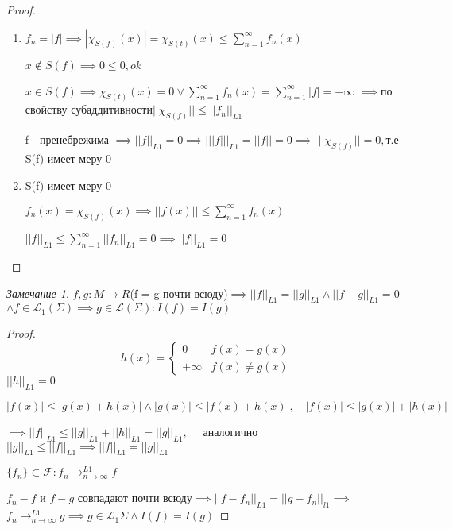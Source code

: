 \documentclass[a4paper]{article}
\theoremstyle{definition}
\theoremstyle{remark}
\newtheorem*{remark}{Замечание}
\begin{document}
\begin{proof}
     \begin{enumerate}
          \item $f_n = |f|\implies |\chi_{S(f)}(x)| = \chi_{S(t)} (x)\leq \sum_{n = 1}^{\infty} f_n(x) $
          
          $x\notin S(f)\implies 0\leq 0, ok$

          $x\in S(f)\implies \chi_{S(t)}(x) = 0 \lor \sum_{n = 1}^{\infty} f_n(x) = \sum_{n = 1}^{\infty} |f| = +\infty $
          $\implies $по свойству субаддитивности$||\chi_{S(f)}||\leq ||f_n||_{L1}$

          f - пренебрежима $\implies ||f||_{L1} = 0\implies |||f|||_{L1} = ||f|| = 0\implies$
          $||\chi_{S(f)}|| = 0,$т.е S(f) имеет меру 0
          \item S(f) имеет меру 0
          
          $f_n(x)=\chi_{S(f)}(x)\implies ||f(x)||\leq \sum_{n = 1}^{\infty} f_n(x) $

          $||f||_{L1}\leq \sum_{n = 1}^{\infty} ||f_n||_{L1} = 0 \implies ||f||_{L1} = 0$
     \end{enumerate}
\end{proof}
\begin{remark}
     $f, g : M\to \bar{R}$(f = g почти всюду)$\implies ||f||_{L1} = ||g||_{L1}\land ||f-g||_{L1} = 0$
     $\land f\in \mathcal{L}_1(\Sigma)\implies g\in \mathcal{L} (\Sigma): I(f) = I(g)$
\end{remark}
\begin{proof}
     \begin{equation*}
          h(x) = 
          \begin{cases}
               0 & \text{$f(x) = g(x)$}\\
               \text{$+\infty$} & \text{$f(x)\neq g(x)$}
          \end{cases}
     \end{equation*}
     $||h||_{L1} = 0$

     $|f(x)|\leq |g(x)+h(x)|\land |g(x)|\leq |f(x) +h(x)|, \quad |f(x)|\leq |g(x)|+|h(x)|$

     $\implies ||f||_{L1}\leq ||g||_{L1} +||h||_{L1} = ||g||_{L1}, \quad$ аналогично $||g||_{L1}\leq ||f||_{L1}\implies ||f||_{L1}=||g||_{L1}$

     $\{f_n\}\subset\mathcal{F} : f_n\to^{L1}_{n\to\infty} f$

     $f_n - f$ и $f - g$ совпадают почти всюду$\implies ||f-f_n||_{L1} = ||g - f_n||_{l1}\implies$
     $f_n\to^{L1}_{n\to\infty} g\implies g\in \mathcal{L}_1{\Sigma} \land  I(f) = I(g)$
\end{proof}
\end{document}
